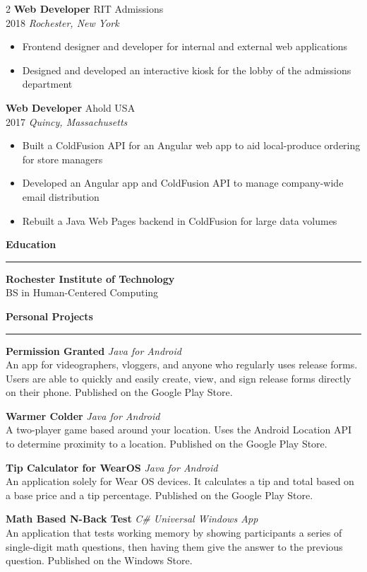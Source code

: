 \documentclass[a4paper,10pt]{article}
\newcommand{\sect}[1]{\vspace{9pt}\textbf{\large #1}\vspace{-10pt}\par\textcolor{maincolor}{\rule{\linewidth}{0.8pt}}\vspace{4pt}}
\begin{document}
\begin{paracol}{2}
\textbf{Web Developer} \hfill RIT Admissions\\
2018 \hfill \textit{Rochester, New York}\par
\begin{itemize}
    \item Frontend designer and developer for internal and external web applications
    \item Designed and developed an interactive kiosk for the lobby of the admissions department
\end{itemize}
\medskip

\textbf{Web Developer} \hfill Ahold USA\\
2017 \hfill \textit{Quincy, Massachusetts}\par
\begin{itemize}
  \item Built a ColdFusion API for an Angular web app to aid local-produce ordering for store managers
  \item Developed an Angular app and ColdFusion API to manage company-wide email distribution
  \item Rebuilt a Java Web Pages backend in ColdFusion for large data volumes
\end{itemize}

\sect{Education}
\textbf{Rochester Institute of Technology}
\\ BS in Human-Centered Computing\par

\sect{Personal Projects}
\textbf{Permission Granted} \hfill \textit{Java for Android}\\	
An app for videographers, vloggers, and anyone who regularly uses release forms. Users are able to quickly and easily create, view, and sign release forms directly on their phone. Published on the Google Play Store.\par
\textbf{Warmer Colder} \hfill \textit{Java for Android}\\	
A two-player game based around your location. Uses the Android Location API to determine proximity to a location. Published on the Google Play Store.\par
\textbf{Tip Calculator for WearOS} \hfill \textit{Java for Android}\\
An application solely for Wear OS devices. It calculates a tip and total based on a base price and a tip percentage. Published on the Google Play Store.\par
\textbf{Math Based N-Back Test} \hfill \textit{C\# Universal Windows App}\\
An application that tests working memory by showing participants a series of single-digit math questions, then having them give the answer to the previous question. Published on the Windows Store.


\end{paracol}
\end{document}
